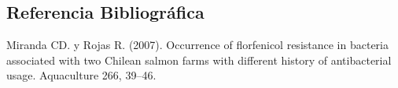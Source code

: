 \documentclass[
  letterpaper,
  DIV=11,
  numbers=noendperiod]{scrartcl}
\begin{document}
\hypertarget{referencia-bibliogruxe1fica}{%
\subsection{Referencia
Bibliográfica}\label{referencia-bibliogruxe1fica}}

Miranda CD. y Rojas R. (2007). Occurrence of florfenicol resistance in
bacteria associated with two Chilean salmon farms with different history
of antibacterial usage. Aquaculture 266, 39--46.
\end{document}
